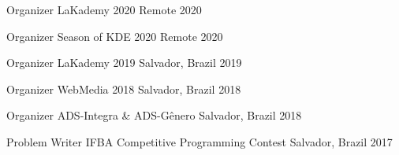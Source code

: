 

\begin{cvhonors}

  \cvhonor
    {Organizer}
    {LaKademy 2020}
    {Remote}
    {2020}

  \cvhonor
    {Organizer}
    {Season of KDE 2020}
    {Remote}
    {2020}

  \cvhonor
    {Organizer}
    {LaKademy 2019}
    {Salvador, Brazil}
    {2019}

  \cvhonor
    {Organizer} %
    {WebMedia 2018} %
    {Salvador, Brazil} %
    {2018} %

  \cvhonor
    {Organizer} %
    {ADS-Integra \& ADS-Gênero} %
    {Salvador, Brazil} %
    {2018} %

  \cvhonor
    {Problem Writer} %
    {IFBA Competitive Programming Contest} %
    {Salvador, Brazil} %
    {2017} %

\end{cvhonors}
